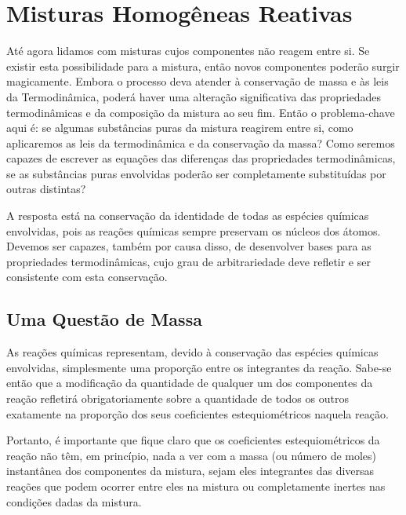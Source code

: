 \chapter{Misturas Homogêneas Reativas}
\label{chap:homogeneousReactiveMixtures}

    Até agora lidamos com misturas cujos componentes não reagem entre si. Se
    existir esta possibilidade para a mistura, então novos componentes poderão
    surgir magicamente. Embora o processo deva atender à conservação de massa e
    às leis da Termodinâmica, poderá haver uma alteração significativa das
    propriedades termodinâmicas e da composição da mistura ao seu fim. Então o
    problema-chave aqui é: se algumas substâncias puras da mistura reagirem
    entre si, como aplicaremos as leis da termodinâmica e da conservação da
    massa? Como seremos capazes de escrever as equações das diferenças das
    propriedades termodinâmicas, se as substâncias puras envolvidas poderão ser
    completamente substituídas por outras distintas?

    A resposta está na conservação da identidade de todas as espécies químicas
    envolvidas, pois as reações químicas sempre preservam os núcleos dos
    átomos. Devemos ser capazes, também por causa disso, de desenvolver bases
    para as propriedades termodinâmicas, cujo grau de arbitrariedade deve
    refletir e ser consistente com esta conservação.


    \section{Uma Questão de Massa} \label{sec:chemicalReactions}

    As reações químicas representam, devido à conservação das espécies químicas
    envolvidas, simplesmente uma proporção entre os integrantes da reação.
    Sabe-se então que a modificação da quantidade de qualquer um dos
    componentes da reação refletirá obrigatoriamente sobre a quantidade de
    todos os outros exatamente na proporção dos seus coeficientes
    estequiométricos naquela reação.

    Portanto, é importante que fique claro que os coeficientes estequiométricos
    da reação não têm, em princípio, nada a ver com a massa (ou número de
    moles) instantânea dos componentes da mistura, sejam eles integrantes das
    diversas reações que podem ocorrer entre eles na mistura ou completamente
    inertes nas condições dadas da mistura.

